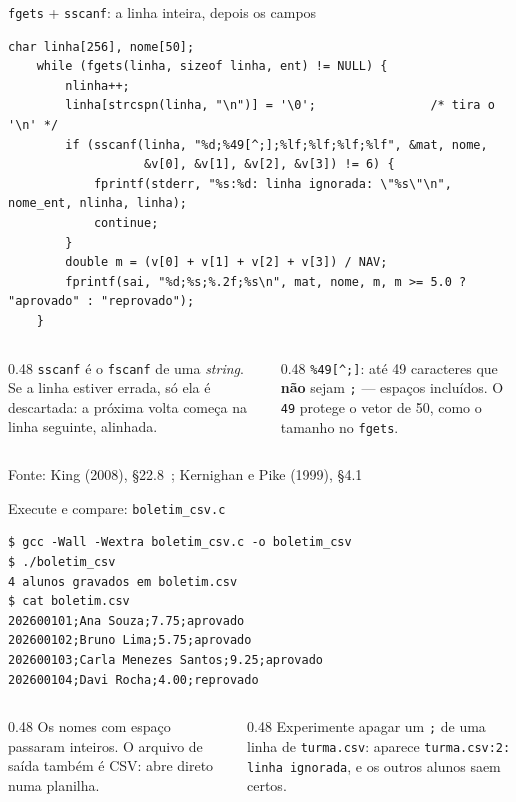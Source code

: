 \documentclass[aspectratio=169]{beamer}
\newcommand{\cir}{\textasciicircum}
\newcommand{\fonte}[1]{\vfill\hfill{\scriptsize\textcolor{UFSGray}{Fonte: #1}}}
\begin{document}
\begin{frame}[fragile]{\texttt{fgets} + \texttt{sscanf}: a linha inteira, depois os campos}
  \vspace{-0.5em}
\begin{lstlisting}[style=codCs]
    char linha[256], nome[50];
    while (fgets(linha, sizeof linha, ent) != NULL) {
        nlinha++;
        linha[strcspn(linha, "\n")] = '\0';                /* tira o '\n' */
        if (sscanf(linha, "%d;%49[^;];%lf;%lf;%lf;%lf", &mat, nome,
                   &v[0], &v[1], &v[2], &v[3]) != 6) {
            fprintf(stderr, "%s:%d: linha ignorada: \"%s\"\n", nome_ent, nlinha, linha);
            continue;
        }
        double m = (v[0] + v[1] + v[2] + v[3]) / NAV;
        fprintf(sai, "%d;%s;%.2f;%s\n", mat, nome, m, m >= 5.0 ? "aprovado" : "reprovado");
    }
\end{lstlisting}
  \begin{columns}[T]
    \begin{column}{0.48\textwidth}
      \small \texttt{sscanf} é o \texttt{fscanf} de uma \emph{string}. Se a
      linha estiver errada, só ela é descartada: a próxima volta começa na
      linha seguinte, alinhada.
    \end{column}
    \begin{column}{0.48\textwidth}
      \small \texttt{\%49[\cir;]}: até 49 caracteres que \textbf{não} sejam
      \texttt{;} --- espaços incluídos. O \texttt{49} protege o vetor de 50,
      como o tamanho no \texttt{fgets}.
    \end{column}
  \end{columns}
  \fonte{King (2008), §22.8~\cite{king2008c};
    Kernighan e Pike (1999), §4.1~\cite{kernighan1999practice}}
\end{frame}

\begin{frame}[fragile]{Execute e compare: \texttt{boletim\_csv.c}}
\begin{lstlisting}[style=shellStyle]
$ gcc -Wall -Wextra boletim_csv.c -o boletim_csv
$ ./boletim_csv
4 alunos gravados em boletim.csv
$ cat boletim.csv
202600101;Ana Souza;7.75;aprovado
202600102;Bruno Lima;5.75;aprovado
202600103;Carla Menezes Santos;9.25;aprovado
202600104;Davi Rocha;4.00;reprovado
\end{lstlisting}
  \begin{columns}[T]
    \begin{column}{0.48\textwidth}
      \small Os nomes com espaço passaram inteiros. O arquivo de saída
      também é CSV: abre direto numa planilha.
    \end{column}
    \begin{column}{0.48\textwidth}
      \small Experimente apagar um \texttt{;} de uma linha de
      \texttt{turma.csv}: aparece \texttt{turma.csv:2: linha ignorada}, e
      os outros alunos saem certos.
    \end{column}
  \end{columns}
\end{frame}
\end{document}
